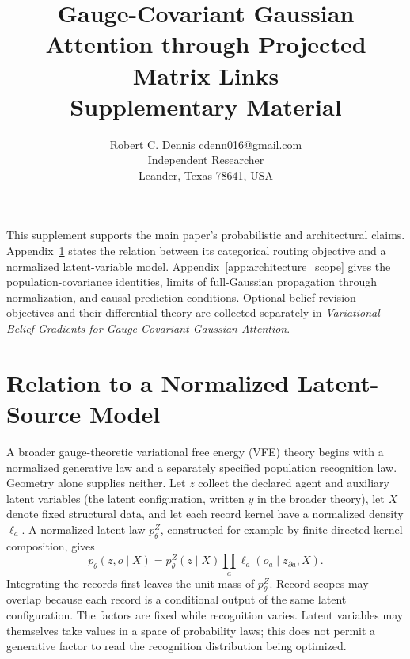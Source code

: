\documentclass[twoside,11pt]{article}
\begin{document}

\title{Gauge-Covariant Gaussian Attention through Projected Matrix Links\\[6pt]
\large Supplementary Material}

\author{\name Robert C. Dennis \email cdenn016@gmail.com \\
  \addr Independent Researcher\\
  \addr Leander, Texas 78641, USA}


\maketitle


This supplement supports the main paper's probabilistic and architectural claims. Appendix~\ref{app:fixed_joint_bridge} states the relation between its categorical routing objective and a normalized latent-variable model. Appendix~\ref{app:architecture_scope} gives the population-covariance identities, limits of full-Gaussian propagation through normalization, and causal-prediction conditions. Optional belief-revision objectives and their differential theory are collected separately in \emph{Variational Belief Gradients for Gauge-Covariant Gaussian Attention}.

\appendix
\renewcommand{\theequation}{S\arabic{equation}}
\renewcommand{\thefigure}{S\arabic{figure}}
\renewcommand{\thetable}{S\arabic{table}}

\section{Relation to a Normalized Latent-Source Model}
\label{app:fixed_joint_bridge}

A broader gauge-theoretic variational free energy (VFE) theory begins with a normalized generative law and a separately specified population recognition law. Geometry alone supplies neither. Let $z$ collect the declared agent and auxiliary latent variables (the latent configuration, written $y$ in the broader theory), let $X$ denote fixed structural data, and let each record kernel have a normalized density $\ell_a$. A normalized latent law $p_\theta^Z$, constructed for example by finite directed kernel composition, gives
\begin{equation}
p_\theta(z,o\mid X)=p_\theta^Z(z\mid X)\prod_a\ell_a(o_a\mid z_{\partial a},X).
\label{eq:rg_bridge_joint}
\end{equation}
Integrating the records first leaves the unit mass of $p_\theta^Z$. Record scopes may overlap because each record is a conditional output of the same latent configuration. The factors are fixed while recognition varies. Latent variables may themselves take values in a space of probability laws; this does not permit a generative factor to read the recognition distribution being optimized.
\end{document}
